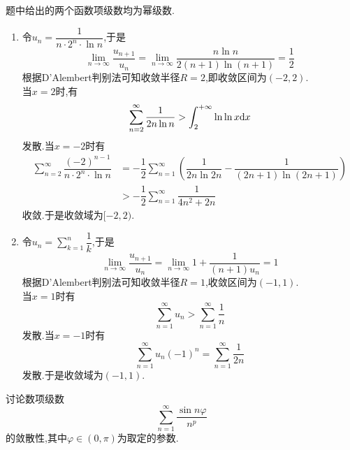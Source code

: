 \documentclass{ctexart}
\begin{document}
\begin{solution}
    题中给出的两个函数项级数均为幂级数.
    \begin{enumerate}[label=\tbf{(\arabic*)},topsep=0pt,parsep=0pt,itemsep=0pt,partopsep=0pt]
        \item 令$u_n=\dfrac{1}{n\cdot 2^n\cdot\ln n}$,于是
            \[\lim_{n\to\infty}\dfrac{u_{n+1}}{u_n}=\lim_{n\to\infty}\dfrac{n\ln n}{2(n+1)\ln(n+1)}=\dfrac12\]
            根据D'Alembert判别法可知收敛半径$R=2$,即收敛区间为$(-2,2)$.\\
            当$x=2$时,有
            \[\sum_{n=2}^{\infty}\dfrac{1}{2n\ln n}>\int_2^{+\infty}\ln\ln x\mathrm{d} x\]
            发散.当$x=-2$时有
            \[\begin{aligned}
                \sum_{n=2}^{\infty}\dfrac{(-2)^{n-1}}{n\cdot2^n\cdot\ln n}
                &= -\dfrac12\sum_{n=1}^{\infty}\left(\dfrac{1}{2n\ln 2n}-\dfrac{1}{(2n+1)\ln(2n+1)}\right) \\
                &> -\dfrac12\sum_{n=1}^{\infty}\dfrac{1}{4n^2+2n}
            \end{aligned}\]
            收敛.于是收敛域为$[-2,2)$.
        \item 令$u_n=\displaystyle\sum_{k=1}^n\dfrac{1}{k}$,于是
            \[\lim_{n\to\infty}\dfrac{u_{n+1}}{u_n}=\lim_{n\to\infty}1+\dfrac{1}{(n+1)u_n}=1\]
            根据D'Alembert判别法可知收敛半径$R=1$,收敛区间为$(-1,1)$.\\
            当$x=1$时有
            \[\sum_{n=1}^{\infty}u_n>\sum_{n=1}^{\infty}\dfrac1n\]
            发散.当$x=-1$时有
            \[\sum_{n=1}^{\infty}u_n(-1)^n=\sum_{n=1}^{\infty}\dfrac{1}{2n}\]
            发散.于是收敛域为$(-1,1)$.
    \end{enumerate}
\end{solution}
\begin{problem}[5.(10\songti{分})]
    讨论数项级数
    \[\sum_{n=1}^{\infty}\dfrac{\sin n\varphi}{n^p}\]
    的敛散性,其中$\varphi\in(0,\pi)$为取定的参数.
\end{problem}
\end{document}
